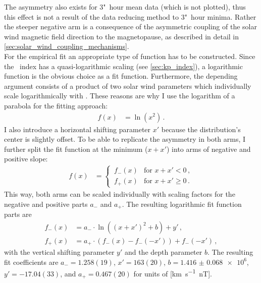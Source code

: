 The asymmetry also exists for 3"~hour mean data (which is not plotted), thus this effect is not a result of the data reducing method to 3"~hour minima. Rather the steeper negative arm is a consequence of the asymmetric coupling of the solar wind magnetic field direction to the magnetopause, as described in detail in \autoref{sec:solar_wind_coupling_mechanisms}.\\

For the empirical fit an appropriate type of function has to be constructed. Since the \Kp~index has a quasi-logarithmic scaling (see \autoref{sec:kp_index}), a logarithmic function is the obvious choice as a fit function. Furthermore, the depending argument consists of a product of two solar wind parameters which individually scale logarithmically with \Kp{}. These reasons are why I use the logarithm of a parabola for the fitting approach:
\begin{align}
	f(x) &= \ln\left(x^2\right)	\,.	\label{eq:log_square_function}
\end{align}
I also introduce a horizontal shifting parameter $x'$ because the distribution's center is slightly offset. To be able to replicate the asymmetry in both arms, I further split the fit function at the minimum ($x + x'$) into arms of negative and positive slope:
\begin{align}
	f(x) &=
	\begin{cases}
		\,f_-(x) &\text{for } x + x' < 0	\,,\\
		\,f_+(x) &\text{for } x + x' \ge 0	\,.
	\end{cases}	\label{eq:log_square_fit_function}
\end{align}
This way, both arms can be scaled individually with scaling factors for the negative and positive parts $a_-$ and $a_+$. The resulting logarithmic fit function parts are
\begin{align}
	f_-(x) &= a_- \cdot \ln\left(\left(x + x'\right)^2 + b\right) + y'	\,,\\
	f_+(x) &= a_+ \cdot \left(f_-(x) - f_-\left(-x'\right)\right) + f_-\left(-x'\right)	\,,
\end{align}
with the vertical shifting parameter $y'$ and the depth parameter $b$. The resulting fit coefficients are \mbox{$a_- = 1.258(19)$}, $x' = 163(20)$, $b = \num{1.416(68)e6}$, $y' = -17.04(33)$, and \mbox{$a_+ = 0.467(20)$} for units of [\si{\km\per\s \nano\tesla}].
